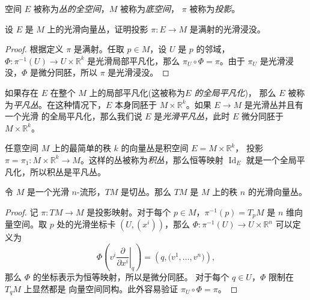 \documentclass[fontset=none]{Notes}
\DeclareMathOperator\Id{Id}
\begin{document}
空间 $E$ 被称为\emph{丛的全空间}，$M$ 被称为\emph{底空间}，
$\pi$ 被称为\emph{投影}。

\begin{exercise}
  设 $E$ 是 $M$ 上的光滑向量丛，证明投影 $\pi:E\to M$
  是满射的光滑浸没。
\end{exercise}
\begin{proof}
  根据定义 $\pi$ 是满射。任取 $p\in M$，设 $U$ 是 $p$ 的邻域，
  $\varPhi:\pi^{-1}(U)\to U\times \mathbb{R}^k$ 是光滑局部平凡化，那么
  $\pi_U\circ\varPhi=\pi$。由于 $\pi_U$ 是光滑浸没，$\varPhi$
  是微分同胚，所以 $\pi$ 是光滑浸没。
\end{proof}

如果存在 $E$ 在整个 $M$ 上的局部平凡化(这被称为\emph{$E$ 的全局平凡化})，
那么 $E$ 被称为\emph{平凡丛}。在这种情况下，$E$ 本身同胚于
$M\times \mathbb{R}^k$。如果 $E\to M$ 是光滑丛并且有一个光滑
的全局平凡化，那么我们说 $E$ 是\emph{光滑平凡丛}，此时
$E$ 微分同胚于 $M\times \mathbb{R}^k$。

\begin{example}[积丛]
  任意空间 $M$ 上的最简单的秩 $k$ 的向量丛是积空间 $E=M\times \mathbb{R}^k$，
  投影 $\pi=\pi_1:M\times \mathbb{R}^k\to M$。这样的丛被称为\emph{积丛}，那么恒等映射
  $\Id_E$ 就是一个全局平凡化，所以积丛是平凡丛。
\end{example}

\begin{proposition}[切丛作为向量丛]
  令 $M$ 是一个光滑 $n$-流形，$TM$ 是切丛。那么
  $TM$ 是 $M$ 上的秩 $n$ 的光滑向量丛。
\end{proposition}
\begin{proof}
  记 $\pi:TM\to M$ 是投影映射。对于每个 $p\in M$，$\pi^{-1}(p)=T_pM$
  是 $n$ 维向量空间。取 $p$ 处的光滑坐标卡 $(U,(x^i))$，那么
  $\varPhi:\pi^{-1}(U)\to U\times \mathbb{R}^n$ 可以定义为
  \[
    \varPhi\left(v^i\left.\frac{\partial}{\partial x^i}\right|_q\right) 
    =\left(q,\bigl(v^1,\dots,v^n\bigr)\right),
  \]
  那么 $\varPhi$ 的坐标表示为恒等映射，所以是微分同胚。
  对于每个 $q\in U$，$\varPhi$ 限制在 $T_qM$ 上显然都是
  向量空间同构。此外容易验证 $\pi_U\circ \varPhi=\pi$。
\end{proof}
 
\end{document}
